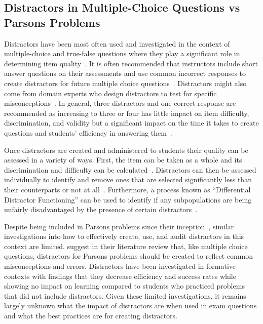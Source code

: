\documentclass[authorversion,nonacm]{acmart}
\begin{document}
\subsection{Distractors in Multiple-Choice Questions vs Parsons Problems}

Distractors have been most often used and investigated in the context of
multiple-choice and true-false questions where they play a significant role in
determining item quality~\cite{gierl2017developing}. It is often recommended
that instructors include short answer questions on their assessments and use
common incorrect responses to create distractors for future multiple choice
questions~\cite{briggs2006diagnostic}.  Distractors might also come from domain
experts who design distractors to test for specific
misconceptions~\cite{guttman1967systematic}. In general, three distractors and one correct response are
recommended as increasing to three or four has little impact on item difficulty,
discrimination, and validity but a significant impact on the time it takes to
create questions and students' efficiency in answering them~\cite{vyas2008multiple}.

Once distractors are created and administered to students their quality can be
assessed in a variety of ways. First, the item can be taken as a whole and its
discrimination and difficulty can be calculated~\cite{mahjabeen2017difficulty}.
Distractors can then be assessed individually to identify and remove ones that are
selected significantly less than their counterparts or not at all~\cite{tarrant2009assessment}.  Furthermore, a process known as
``Differential Distractor Functioning'' can be used to identify if any
subpopulations are being unfairly disadvantaged by the presence of certain
distractors~\cite{green1989method}.

Despite being included in Parsons problems since their
inception~\cite{parsons2006parson}, similar investigations into how to
effectively create, use, and audit distractors in this context
are limited. \citet{du2020review} suggest in their literature review that, like
multiple choice questions, distractors for Parsons problems should be created to
reflect common misconceptions and errors. Distractors have been investigated in
formative contexts with \citet{harms2016distractors} findings that they decrease
efficiency and success rates while showing no impact on learning compared to
students who practiced problems that did not include distractors. Given these
limited investigations, it remains largely unknown what the impact of distractors
are when used in exam questions and what the best practices are for creating
distractors.
\end{document}
